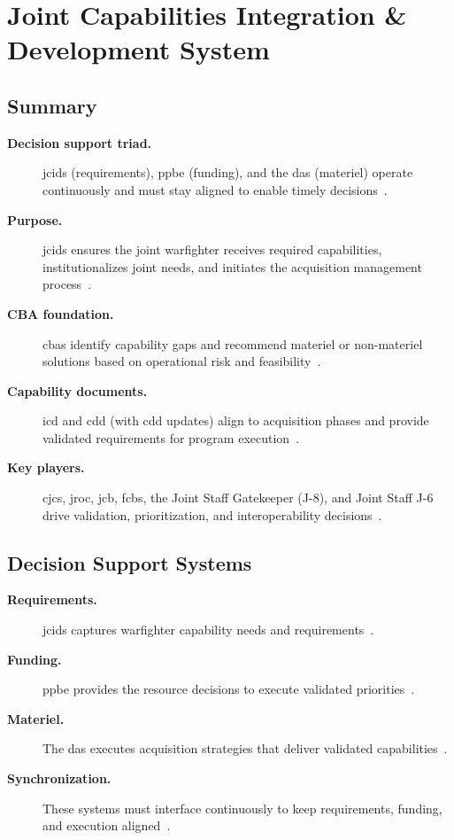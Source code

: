 \documentclass[../main.tex]{subfiles}
\begin{document}
\section{Joint Capabilities Integration \& Development System}

\subsection{Summary}
\begin{description}
  \item[\textbf{Decision support triad.}] \ac{jcids} (requirements), \ac{ppbe} (funding), and the \ac{das} (materiel) operate continuously and must stay aligned to enable timely decisions~\autocite{edo-3-3-3-jcids-2025}.
  \item[\textbf{Purpose.}] \ac{jcids} ensures the joint warfighter receives required capabilities, institutionalizes joint needs, and initiates the acquisition management process~\autocite{edo-3-3-3-jcids-2025}.
  \item[\textbf{CBA foundation.}] \acp{cba} identify capability gaps and recommend materiel or non-materiel solutions based on operational risk and feasibility~\autocite{edo-3-3-3-jcids-2025}.
  \item[\textbf{Capability documents.}] \ac{icd} and \ac{cdd} (with \ac{cdd} updates) align to acquisition phases and provide validated requirements for program execution~\autocite{edo-3-3-3-jcids-2025}.
  \item[\textbf{Key players.}] \ac{cjcs}, \ac{jroc}, \ac{jcb}, \acp{fcb}, the Joint Staff Gatekeeper (J-8), and Joint Staff J-6 drive validation, prioritization, and interoperability decisions~\autocite{edo-3-3-3-jcids-2025}.
\end{description}

\subsection{Decision Support Systems}
\begin{description}
  \item[\textbf{Requirements.}] \ac{jcids} captures warfighter capability needs and requirements~\autocite{edo-3-3-3-jcids-2025}.
  \item[\textbf{Funding.}] \ac{ppbe} provides the resource decisions to execute validated priorities~\autocite{edo-3-3-3-jcids-2025}.
  \item[\textbf{Materiel.}] The \ac{das} executes acquisition strategies that deliver validated capabilities~\autocite{edo-3-3-3-jcids-2025}.
  \item[\textbf{Synchronization.}] These systems must interface continuously to keep requirements, funding, and execution aligned~\autocite{edo-3-3-3-jcids-2025}.
\end{description}
\end{document}
